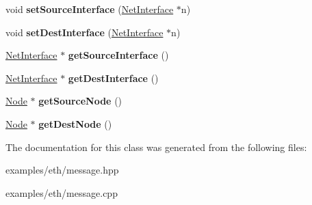 \begin{DoxyCompactItemize}
\item 
void {\bfseries set\+Source\+Interface} (\hyperlink{classNetInterface}{Net\+Interface} $\ast$n)\hypertarget{classMessage_ac400b185483d388631653aa5fe235074}{}\label{classMessage_ac400b185483d388631653aa5fe235074}

\item 
void {\bfseries set\+Dest\+Interface} (\hyperlink{classNetInterface}{Net\+Interface} $\ast$n)\hypertarget{classMessage_a5d01a48ec0a68b973986fd86cc743dcf}{}\label{classMessage_a5d01a48ec0a68b973986fd86cc743dcf}

\item 
\hyperlink{classNetInterface}{Net\+Interface} $\ast$ {\bfseries get\+Source\+Interface} ()\hypertarget{classMessage_a3cae31aec0d91cd265b6a815f24212ae}{}\label{classMessage_a3cae31aec0d91cd265b6a815f24212ae}

\item 
\hyperlink{classNetInterface}{Net\+Interface} $\ast$ {\bfseries get\+Dest\+Interface} ()\hypertarget{classMessage_a6772bac9293b34350363cf1b487b2652}{}\label{classMessage_a6772bac9293b34350363cf1b487b2652}

\item 
\hyperlink{classNode}{Node} $\ast$ {\bfseries get\+Source\+Node} ()\hypertarget{classMessage_a1eb3e10047b827a71180a78e389bfec3}{}\label{classMessage_a1eb3e10047b827a71180a78e389bfec3}

\item 
\hyperlink{classNode}{Node} $\ast$ {\bfseries get\+Dest\+Node} ()\hypertarget{classMessage_ab046eca1dce1cc3a7f4fbdab45fddfb2}{}\label{classMessage_ab046eca1dce1cc3a7f4fbdab45fddfb2}

\end{DoxyCompactItemize}


The documentation for this class was generated from the following files\+:\begin{DoxyCompactItemize}
\item 
examples/eth/message.\+hpp\item 
examples/eth/message.\+cpp\end{DoxyCompactItemize}
